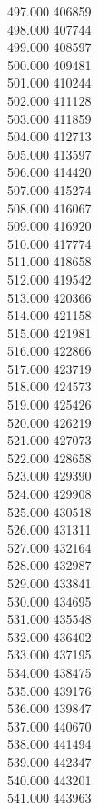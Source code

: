 { 497.000	406859 \\
 498.000	407744 \\
 499.000	408597 \\
 500.000	409481 \\
 501.000	410244 \\
 502.000	411128 \\
 503.000	411859 \\
 504.000	412713 \\
 505.000	413597 \\
 506.000	414420 \\
 507.000	415274 \\
 508.000	416067 \\
 509.000	416920 \\
 510.000	417774 \\
 511.000	418658 \\
 512.000	419542 \\
 513.000	420366 \\
 514.000	421158 \\
 515.000	421981 \\
 516.000	422866 \\
 517.000	423719 \\
 518.000	424573 \\
 519.000	425426 \\
 520.000	426219 \\
 521.000	427073 \\
 522.000	428658 \\
 523.000	429390 \\
 524.000	429908 \\
 525.000	430518 \\
 526.000	431311 \\
 527.000	432164 \\
 528.000	432987 \\
 529.000	433841 \\
 530.000	434695 \\
 531.000	435548 \\
 532.000	436402 \\
 533.000	437195 \\
 534.000	438475 \\
 535.000	439176 \\
 536.000	439847 \\
 537.000	440670 \\
 538.000	441494 \\
 539.000	442347 \\
 540.000	443201 \\
 541.000	443963 \\
}
